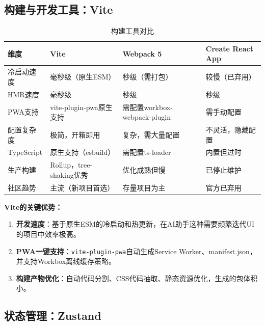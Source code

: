 \documentclass[fontset=mac,a4paper,11pt]{ctexart}
\begin{document}
\subsection{构建与开发工具：Vite}

\begin{table}[H]
\centering
\caption{构建工具对比}
\label{tab:build-tools}
\begin{tabular}{L{2.5cm}L{3.5cm}L{3.5cm}L{3.5cm}}
\toprule
\textbf{维度} & \textbf{Vite} & \textbf{Webpack 5} & \textbf{Create React App} \\
\midrule
{}
冷启动速度 & 毫秒级（原生ESM） & 秒级（需打包） & 较慢（已弃用） \\
HMR速度 & 毫秒级 & 秒级 & 秒级 \\
PWA支持 & vite-plugin-pwa原生支持 & 需配置workbox-webpack-plugin & 需手动配置 \\
配置复杂度 & 极简，开箱即用 & 复杂，需大量配置 & 不灵活，隐藏配置 \\
TypeScript & 原生支持（esbuild） & 需配置ts-loader & 内置但过时 \\
生产构建 & Rollup，tree-shaking优秀 & 优化成熟但慢 & 已停止维护 \\
社区趋势 & 主流（新项目首选） & 存量项目为主 & 官方已弃用 \\
\bottomrule
\end{tabular}
\end{table}

\textbf{Vite的关键优势：}

\begin{enumerate}[leftmargin=2em]
\item \textbf{开发速度}：基于原生ESM的冷启动和热更新，在AI助手这种需要频繁迭代UI的项目中效率极高。
\item \textbf{PWA一键支持}：\texttt{vite-plugin-pwa}自动生成Service Worker、manifest.json，并支持Workbox离线缓存策略。
\item \textbf{构建产物优化}：自动代码分割、CSS代码抽取、静态资源优化，生成的包体积小。
\end{enumerate}

\subsection{状态管理：Zustand}
\end{document}
